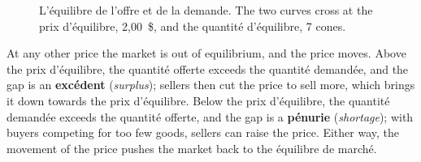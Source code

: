 \begin{figure}[h!]
  \centering
  \caption*{\small L'équilibre de l'offre et de la demande. The two curves cross at
  the prix d'équilibre, 2,00~\$, and the quantité d'équilibre, 7 cones.}
\end{figure}

At any other price the market is out of equilibrium, and the price moves. Above the
prix d'équilibre, the quantité offerte exceeds the quantité demandée, and the gap is
an \textbf{excédent} (\textit{surplus}); sellers then cut the price to sell more,
which brings it down towards the prix d'équilibre. Below the prix d'équilibre, the
quantité demandée exceeds the quantité offerte, and the gap is a \textbf{pénurie}
(\textit{shortage}); with buyers competing for too few goods, sellers can raise the
price. Either way, the movement of the price pushes the market back to the
équilibre de marché.

